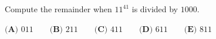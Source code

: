 Compute the remainder when $11^{41}$ is divided by $1000$.

$\textbf{(A) }011\qquad\textbf{(B) }211\qquad\textbf{(C) }411\qquad\textbf{(D) }611\qquad\textbf{(E) }811$
